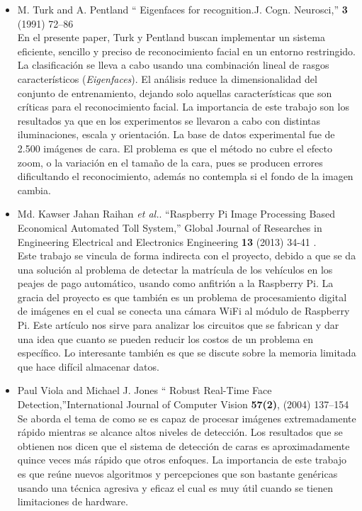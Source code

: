 \documentclass[letterpaper,12pt]{article}
\begin{document}
%

\begin{itemize}
\item M. Turk and A. Pentland
`` Eigenfaces for recognition.J. Cogn. Neurosci,'' \textbf{3} (1991) 72–86 \cite{Turk}\\

En el presente paper, Turk y Pentland buscan implementar un sistema eficiente, sencillo y preciso de reconocimiento facial en un entorno restringido. La clasificación se lleva a cabo usando una combinación lineal de rasgos característicos (\emph{Eigenfaces}). El análisis reduce la dimensionalidad del conjunto de entrenamiento, dejando solo aquellas características que son críticas para el reconocimiento facial. La importancia de este trabajo son los resultados ya que en los experimentos se llevaron a cabo con distintas iluminaciones, escala y orientación. La base de datos experimental fue de 2.500 imágenes de cara. El problema es que el método no cubre el efecto zoom, o la variación en el tamaño de la cara, pues se producen errores dificultando el reconocimiento, además no contempla si el fondo de la imagen cambia.

\item Md. Kawser Jahan Raihan  \textit{et al.}. ``Raspberry Pi Image Processing Based Economical Automated 
Toll System,''
Global Journal of Researches in Engineering
Electrical and Electronics Engineering  \textbf{13} (2013) 34-41 \cite{RaspberryTollSyst}.\\

Este trabajo se vincula de forma indirecta con el proyecto, debido a que se da una solución al problema de detectar la matrícula de los vehículos en los peajes de pago automático, usando como anfitrión a la Raspberry Pi. La gracia del proyecto es que también es un problema de procesamiento digital de imágenes en el cual se conecta una cámara WiFi al módulo de Raspberry Pi. Este artículo nos sirve para analizar los circuitos que se fabrican y dar una idea que cuanto se pueden reducir  los costos de un problema en específico. Lo interesante también es que se discute sobre la memoria limitada que hace difícil almacenar datos.

\item Paul Viola and Michael J. Jones
`` Robust Real-Time Face Detection,''International Journal of Computer Vision \textbf{57(2)}, (2004) 137–154  \cite{Viola}\\

\label{Paper:RobustReal-Time}
Se aborda el tema de como se es capaz de procesar imágenes extremadamente rápido mientras se alcance altos niveles de detección. Los resultados que se obtienen nos dicen que el sistema de detección de caras es aproximadamente quince veces más rápido que otros enfoques. La importancia de este trabajo es que reúne nuevos algoritmos y percepciones que son bastante genéricas usando una técnica agresiva y eficaz el cual es muy útil cuando se tienen limitaciones de hardware.
\end{itemize}
\newpage
\end{document}
